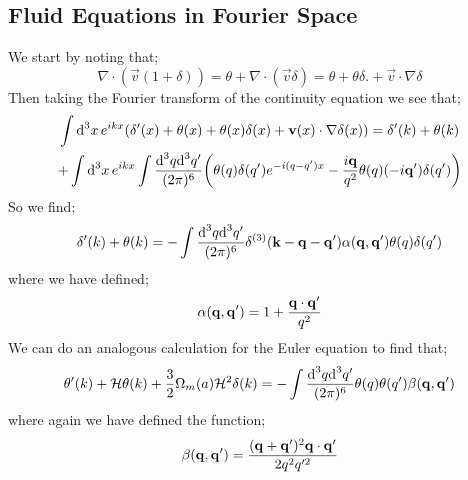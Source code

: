 \subsection{Fluid Equations in Fourier Space}
We start by noting that;
\begin{equation*}
\nabla\cdot\left(\vec{v}(1 + \delta)\right) = \theta + \nabla \cdot (\vec{v}\delta) = \theta + \theta \delta. + \vec{v}\cdot\nabla \delta
\end{equation*}
Then taking the Fourier transform of the continuity equation we see that;
\begin{multline*}
\int{\upd{^3 x}e^{ikx}\left(\delta\pr(x) + \theta(x) + \theta(x)\delta(x) + \vec{v}(x)\cdot\nabla \delta(x)\right)}  = \delta\pr(k) + \theta(k) \\ + \int{\upd{^3 x}e^{ikx}\int{\frac{\ud^3 q \ud^3 q\pr}{(2\pi)^6}\left(\theta(q)\delta(q\pr)e^{-i(q - q\pr)x} - \frac{i\vec{q}}{q^2}\theta(q)(-i\vec{q}\pr)\delta(q\pr)\right)}}
\end{multline*}
So we find;
\begin{equation*}
\delta^{\prime}(k) + \theta(k) = -\int{\frac{\text{d}^3 q\text{d}^3 q^{\prime}}{(2\pi)^6}\delta^{(3)}(\mathbf{k} - \mathbf{q}- \mathbf{q}^{\prime})\alpha(\mathbf{q}, \mathbf{q}^{\prime})\theta(q)\delta(q^{\prime})}
\end{equation*}
where we have defined;
\begin{equation*}
\alpha(\mathbf{q}, \mathbf{q}^{\prime}) = 1 + \frac{\mathbf{q}\cdot\mathbf{q}^{\prime}}{q^2}
\end{equation*}
We can do an analogous calculation for the Euler equation to find that;
\begin{multline*}
\theta^{\prime}(k) + \mathcal{H} \theta(k) + \frac{3}{2}\Omega_m(a) \mathcal{H}^2 \delta(k) = - \int{\frac{\text{d}^3 q \text{d}^3 q^{\prime}}{(2\pi)^6}\theta(q)\theta(q^{\prime})\beta(\mathbf{q}, \mathbf{q}^{\prime})}
\end{multline*}
where again we have defined the function;
\begin{equation*}
\beta(\mathbf{q}, \mathbf{q}^{\prime}) = \frac{(\mathbf{q} + \mathbf{q}^{\prime})^2 \mathbf{q}\cdot\mathbf{q}^{\prime}}{2q^2 q^{\prime 2}}
\end{equation*}
